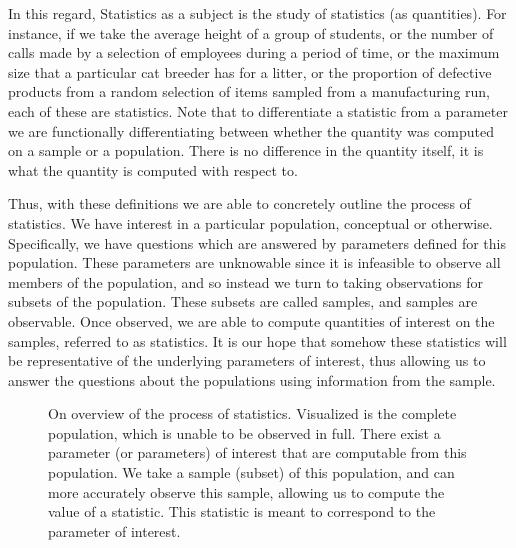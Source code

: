 \documentclass[
  letterpaper,
  DIV=11,
  numbers=noendperiod]{scrreprt}
\theoremstyle{definition}
\theoremstyle{definition}
\theoremstyle{definition}
\theoremstyle{remark}
\begin{document}
In this regard, Statistics as a subject is the study of statistics (as
quantities). For instance, if we take the average height of a group of
students, or the number of calls made by a selection of employees during
a period of time, or the maximum size that a particular cat breeder has
for a litter, or the proportion of defective products from a random
selection of items sampled from a manufacturing run, each of these are
statistics. Note that to differentiate a statistic from a parameter we
are functionally differentiating between whether the quantity was
computed on a sample or a population. There is no difference in the
quantity itself, it is what the quantity is computed with respect to.

Thus, with these definitions we are able to concretely outline the
process of statistics. We have interest in a particular population,
conceptual or otherwise. Specifically, we have questions which are
answered by parameters defined for this population. These parameters are
unknowable since it is infeasible to observe all members of the
population, and so instead we turn to taking observations for subsets of
the population. These subsets are called samples, and samples are
observable. Once observed, we are able to compute quantities of interest
on the samples, referred to as statistics. It is our hope that somehow
these statistics will be representative of the underlying parameters of
interest, thus allowing us to answer the questions about the populations
using information from the sample.

\begin{figure}[H]

\caption{\label{fig-population-sample}On overview of the process of
statistics. Visualized is the complete population, which is unable to be
observed in full. There exist a parameter (or parameters) of interest
that are computable from this population. We take a sample (subset) of
this population, and can more accurately observe this sample, allowing
us to compute the value of a statistic. This statistic is meant to
correspond to the parameter of interest.}


\end{figure}%
\end{document}
